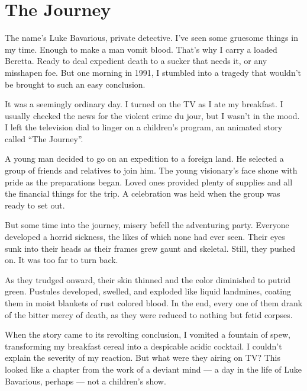 \chapter{The Journey}


The name's Luke Bavarious, private detective. I've seen
some gruesome things in my time. Enough to make a man vomit blood.
That's why I carry a loaded Beretta. Ready to deal expedient
death to a sucker that needs it, or any misshapen foe. But one
morning in 1991, I stumbled into a tragedy that wouldn't be
brought to such an easy conclusion.



It was a seemingly ordinary day. I turned on the TV as I ate my
breakfast. I usually checked the news for the violent crime du
jour, but I wasn't in the mood. I left the television dial to
linger on a children's program, an animated story called
``The Journey''.



A young man decided to go on an expedition to a foreign land. He
selected a group of friends and relatives to join him. The young
visionary's face shone with pride as the preparations began.
Loved ones provided plenty of supplies and all the financial things
for the trip. A celebration was held when the group was ready to
set out.



But some time into the journey, misery befell the adventuring
party. Everyone developed a horrid sickness, the likes of which
none had ever seen. Their eyes sunk into their heads as their
frames grew gaunt and skeletal. Still, they pushed on. It was too
far to turn back.



As they trudged onward, their skin thinned and the color diminished
to putrid green. Pustules developed, swelled, and exploded like
liquid landmines, coating them in moist blankets of rust colored
blood. In the end, every one of them drank of the bitter mercy of
death, as they were reduced to nothing but fetid corpses.



When the story came to its revolting conclusion, I vomited a
fountain of spew, transforming my breakfast cereal into a
despicable acidic cocktail. I couldn't explain the severity
of my reaction. But what were they airing on TV? This looked like a
chapter from the work of a deviant mind --- a day in the life
of Luke Bavarious, perhaps --- not a children's
show.



